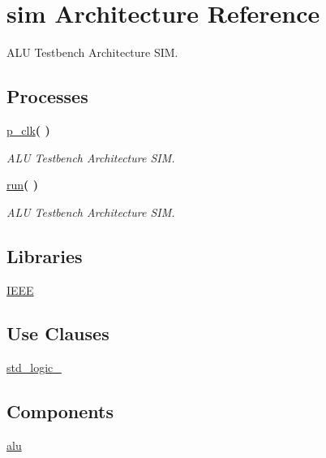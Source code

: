 \hypertarget{classtb__alu_1_1sim}{}\section{sim Architecture Reference}
\label{classtb__alu_1_1sim}


A\+LU Testbench Architecture S\+IM.  


\subsection*{Processes}
 \begin{DoxyCompactItemize}
\item 
\hyperlink{classtb__alu_1_1sim_af35c81fcf5e4601a4e5d669b422cf79a}{p\+\_\+clk}{\bfseries  (  )}
\begin{DoxyCompactList}\small\item\em A\+LU Testbench Architecture S\+IM. \end{DoxyCompactList}\item 
\hyperlink{classtb__alu_1_1sim_a0f40b896b2461e250ebafd4e27b8ff54}{run}{\bfseries  (  )}
\begin{DoxyCompactList}\small\item\em A\+LU Testbench Architecture S\+IM. \end{DoxyCompactList}\end{DoxyCompactItemize}
\subsection*{Libraries}
 \begin{DoxyCompactItemize}
\item 
\hyperlink{classtb__alu_1_1sim_ae4f03c286607f3181e16b9aa12d0c6d4}{I\+E\+EE} 
\end{DoxyCompactItemize}
\subsection*{Use Clauses}
 \begin{DoxyCompactItemize}
\item 
\hyperlink{classtb__alu_1_1sim_acd03516902501cd1c7296a98e22c6fcb}{std\+\_\+logic\+\_}   
\end{DoxyCompactItemize}
\subsection*{Components}
 \begin{DoxyCompactItemize}
\item 
\hyperlink{classtb__alu_1_1sim_a205ce47b385f0dede25ae06417988605}{alu}  {\bfseries }  
\end{DoxyCompactItemize}
